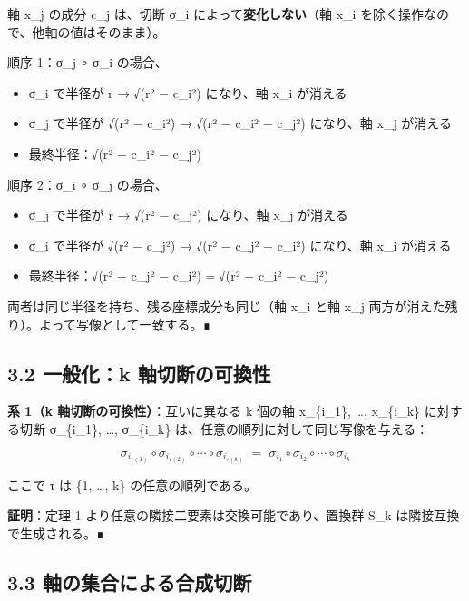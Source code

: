 \documentclass[a4paper,11pt]{ltjsarticle}
\theoremstyle{definition}
\theoremstyle{remark}
\providecommand{\tightlist}{%
  \setlength{\itemsep}{0pt}\setlength{\parskip}{0pt}}
\begin{document}
軸 x\_j の成分 c\_j は、切断 σ\_i によって\textbf{変化しない}（軸 x\_i
を除く操作なので、他軸の値はそのまま）。

順序 1：σ\_j ∘ σ\_i の場合、

\begin{itemize}
\tightlist
\item
  σ\_i で半径が r → √(r² − c\_i²) になり、軸 x\_i が消える
\item
  σ\_j で半径が √(r² − c\_i²) → √(r² − c\_i² − c\_j²) になり、軸 x\_j
  が消える
\item
  最終半径：√(r² − c\_i² − c\_j²)
\end{itemize}

順序 2：σ\_i ∘ σ\_j の場合、

\begin{itemize}
\tightlist
\item
  σ\_j で半径が r → √(r² − c\_j²) になり、軸 x\_j が消える
\item
  σ\_i で半径が √(r² − c\_j²) → √(r² − c\_j² − c\_i²) になり、軸 x\_i
  が消える
\item
  最終半径：√(r² − c\_j² − c\_i²) = √(r² − c\_i² − c\_j²)
\end{itemize}

両者は同じ半径を持ち、残る座標成分も同じ（軸 x\_i と軸 x\_j
両方が消えた残り）。よって写像として一致する。∎

\subsection{3.2 一般化：k
軸切断の可換性}\label{ux4e00ux822cux5316k-ux8ef8ux5207ux65adux306eux53efux63dbux6027}

\textbf{系 1（k 軸切断の可換性）}：互いに異なる k 個の軸 x\_\{i\_1\},
\ldots, x\_\{i\_k\} に対する切断 σ\_\{i\_1\}, \ldots, σ\_\{i\_k\}
は、任意の順列に対して同じ写像を与える：

\[
\sigma_{i_{\tau(1)}} \circ \sigma_{i_{\tau(2)}} \circ \cdots \circ \sigma_{i_{\tau(k)}} \;=\; \sigma_{i_1} \circ \sigma_{i_2} \circ \cdots \circ \sigma_{i_k}
\]

ここで τ は \{1, \ldots, k\} の任意の順列である。

\textbf{証明}：定理 1 より任意の隣接二要素は交換可能であり、置換群 S\_k
は隣接互換で生成される。∎

\subsection{3.3
軸の集合による合成切断}\label{ux8ef8ux306eux96c6ux5408ux306bux3088ux308bux5408ux6210ux5207ux65ad}
\end{document}
